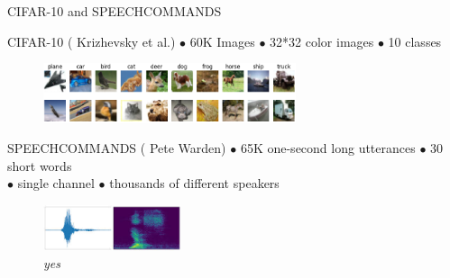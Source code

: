 \documentclass{beamer}
\begin{document}
\begin{frame}{CIFAR-10 and SPEECHCOMMANDS}
    \begin{block}{ CIFAR-10 \tiny{(\cite{Krizhevsky2009LearningML} Krizhevsky et al.)} }
    $\bullet$ 60K Images $\bullet$ 32*32 color images $\bullet$ 10 classes
    \end{block}
    \begin{figure}
        \includegraphics[width=0.66\textwidth]{images/cifar10.png}
    \end{figure}
    
    \begin{block}{SPEECHCOMMANDS \tiny{(\cite{DBLP:journals/corr/abs-1804-03209} Pete Warden)} }
    $\bullet$ 65K one-second long utterances $\bullet$ 30 short words\\
    $\bullet$ single channel $\bullet$ thousands of different speakers
    \end{block}
    \begin{figure}
        \includegraphics[width=0.36\textwidth]{images/yes.jpg}
        \caption*{\emph{yes}}
    \end{figure}
    
\end{frame}
\end{document}
